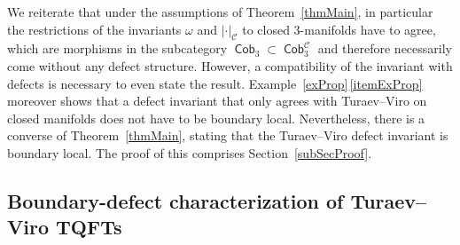 \documentclass[10pt,a4paper]{amsart}
\DeclareMathOperator{\Cob}{\mathsf{Cob}}
\DeclareMathOperator{\calc}{\mathcal{C}}
\numberwithin{equation}{section}
\theoremstyle{definition}
\begin{document}
We reiterate that under the assumptions of Theorem~\ref{thmMain}, in particular the restrictions of the invariants $\omega$ and $| \cdot |_{\calc}$ to closed 3-manifolds have to agree, which are morphisms in the subcategory $\Cob_3 \subset \Cob_3^{\calc}$ and therefore necessarily come without any defect structure. However, a compatibility of the invariant with defects is necessary to even state the result. Example~\ref{exProp}\,\ref{itemExProp} moreover shows that a defect invariant that only agrees with Turaev--Viro on closed manifolds does not have to be boundary local. Nevertheless, there is a converse of Theorem~\ref{thmMain}, stating that the Turaev--Viro defect invariant is boundary local. The proof of this comprises Section~\ref{subSecProof}.

\subsection{Boundary-defect characterization of Turaev--Viro TQFTs}
\end{document}
